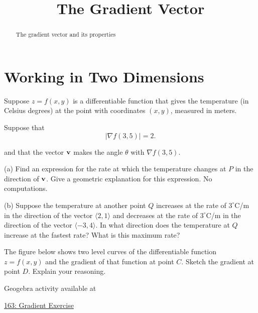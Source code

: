 \documentclass{ximera}
\title{The Gradient Vector}
\begin{document}
\begin{abstract}
The gradient vector and its properties
\end{abstract}
\maketitle

\section{Working in Two Dimensions}

\begin{question}  \label{Qert4thbhg}
Suppose $z=f(x,y)$ is a differentiable function that gives the temperature (in Celsius degrees) at the point with coordinates $(x,y)$, measured in meters.

Suppose that 
\[
    \Big|  \nabla f(3,5) \Big| = 2 .
\]

and that the vector ${\bf v}$ makes the angle $\theta$ with $\nabla f(3,5)$.

(a) Find an expression for the rate at which the temperature changes at $P$ in the direction of ${\bf v}$. Give a geometric explanation for this expression. No computations.

(b) Suppose the temperature at another point $Q$ increases at the rate of $3^\circ$C/m in the direction of the vector $\langle 2,1\rangle$ and decreases at the rate of $3^\circ$C/m in the direction of the vector $\langle -3,4\rangle$. In what direction does the temperature at $Q$ increase at the fastest rate? What is this maximum rate?

\end{question}


\begin{question}  \label{Qdr4356}
The figure below shows two level curves of the differentiable function $z=f(x,y)$ and the gradient of that function at point $C$. Sketch the gradient at point $D$. Explain your reasoning.

 
\begin{onlineOnly}
    \begin{center}
\end{center}
\end{onlineOnly}

Geogebra activity available at

\href{https://www.geogebra.org/classic/zau4grcm}{163: Gradient Exercise}
\end{question}
\end{document}
